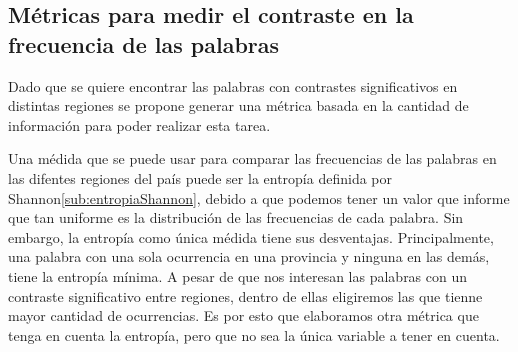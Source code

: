 \subsection{Métricas para medir el contraste en la frecuencia de las palabras}
Dado que se quiere encontrar las palabras con contrastes significativos en distintas 
regiones se propone generar una métrica basada en la cantidad de información 
para poder realizar esta tarea.

Una médida que se puede usar para comparar las frecuencias de las palabras en las difentes regiones del país puede ser la entropía definida por Shannon\ref{sub:entropiaShannon}, debido a que podemos tener un valor que informe que tan uniforme es la distribución de las frecuencias de cada palabra.
Sin embargo, la entropía como única médida tiene sus desventajas. Principalmente, una palabra con una sola ocurrencia en una provincia y ninguna en las demás, tiene la entropía mínima. A pesar de que nos interesan las palabras con un contraste significativo entre regiones, dentro de ellas eligiremos las que tienne mayor cantidad de ocurrencias. Es por esto que elaboramos otra métrica que tenga en cuenta la entropía, pero que no sea la única variable a tener en cuenta.


